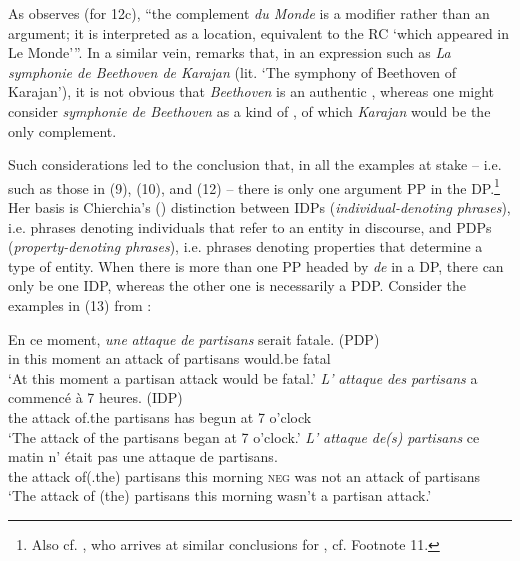 \documentclass[output=paper]{langsci/langscibook}
\begin{document}
As \citet[268, Footnote 31]{Godard1992} observes (for 12c), “the complement \textit{du Monde} is a modifier rather than an argument; it is interpreted as a location, equivalent to the RC ‘which appeared in Le Monde’”. In a similar vein, \citet[86–87, Footnote 2]{Milner1982} remarks that, in an expression such as \textit{La symphonie de Beethoven de Karajan} (lit. ‘The symphony of Beethoven of Karajan’), it is not obvious that \textit{Beethoven} is an authentic \AGENT, whereas one might consider \textit{symphonie de Beethoven} as a kind of , of which \textit{Karajan} would be the only complement.

Such considerations led \citet{Kolliakou1999} to the conclusion that, in all the examples at stake – i.e. such as those in (9), (10), and (12) – there is only one argument PP in the DP.\footnote{Also cf. \citet[93]{Cinque2014}, who arrives at similar conclusions for , cf. Footnote 11.} Her basis is Chierchia's (\citeyear{Chierchia1982,Chierchia1985}) distinction between IDPs (\textit{individual-denoting phrases}), i.e. phrases denoting individuals that refer to an entity in discourse, and PDPs (\textit{property-denoting phrases}), i.e. phrases denoting properties that determine a type of entity. When there is more than one PP headed by \textit{de} in a DP, there can only be one IDP, whereas the other one is necessarily a PDP. Consider the examples in (13) from \citet[736]{Kolliakou1999}:

\ea%
    \label{ex:mensch:13}
    \ea
    \gll En ce moment,  \textit{une}  \textit{attaque}  \textit{de}  \textit{partisans}  serait  fatale. (PDP)\\
         in this  moment  an  attack  of  partisans  would.be  fatal\\
    \glt ‘At this moment a partisan attack would be fatal.’
    \ex  
    \gll \textit{L’} \textit{attaque}  \textit{des}  \textit{partisans}  a  commencé  à {7 heures}. (IDP)\\
         the attack  of.the  partisans  has  begun    at {7 o’clock}\\
    \glt ‘The attack of the partisans began at 7 o’clock.’
    \ex  
    \gll \textit{L’}  \textit{attaque}  \textit{de(s)}   \textit{partisans}  ce  matin    n’ était    pas       une  attaque  de  partisans.\\
         the  attack    of(.the) partisans  this  morning  \textsc{neg} was  not    an  attack    of  partisans\\
    \glt ‘The attack of (the) partisans this morning wasn’t a partisan attack.’
    \z
\z
\end{document}

